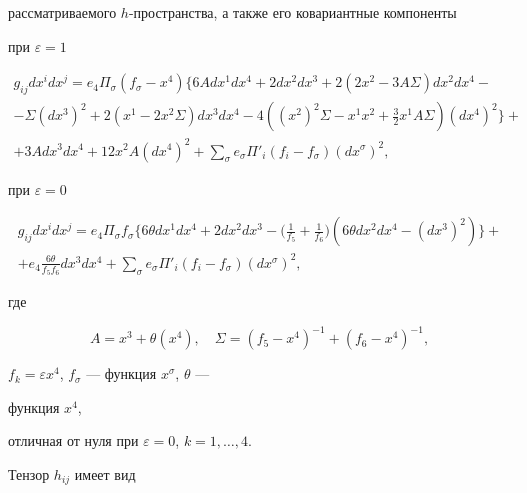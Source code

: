 рассматриваемого $h$-пространства, а также его ковариантные компоненты 





\noindent при $\varepsilon=1$ 


\begin{multline} 


g_{ij}dx^i dx^j=e_4\Pi_\sigma(f_\sigma-x^4) 


\{6A dx^1dx^4+2dx^2dx^3+2(2x^2-3A\Sigma)dx^2dx^4 -\\ 


%


-\Sigma(dx^3)^2+2(x^1-2x^2\Sigma)dx^3dx^4-4((x^2)^2\Sigma- 


x^1x^2+\tfrac{3}{2}x^1A\Sigma)(dx^4)^2\}+ \\ 


%


+3A dx^3dx^4+12 x^2A(dx^4)^2+\sum_\sigma e_\sigma\Pi'_i 


(f_i-f_\sigma)(dx^\sigma)^2, 


\end{multline} 


при $\varepsilon=0$ 


\begin{multline} 


g_{ij}dx^i dx^j=e_4\Pi_\sigma f_\sigma\{6\theta dx^1dx^4+ 


2dx^2dx^3-\big(\tfrac{1}{f_5}+\tfrac{1}{f_6}\big) 


(6\theta dx^2dx^4-(dx^3)^2)\}+ \\ 


+e_4\tfrac{6\theta}{f_5f_6}dx^3dx^4+\sum_\sigma e_\sigma 


\Pi'_i(f_i-f_\sigma)(dx^\sigma)^2, 


\end{multline} 


где 


$$ 


A=x^3+\theta(x^4),\quad \Sigma=(f_5-x^4)^{-1}+ 


(f_6-x^4)^{-1}, 


$$ 


$f_k=\varepsilon x^4$, $f_\sigma$ --- функция $x^\sigma$, $\theta$ --- 


функция $x^4$, 


отличная от нуля при $\varepsilon=0$, $k=1,\dotsc,4$. 


 


Тензор $h_{ij}$ имеет вид 


